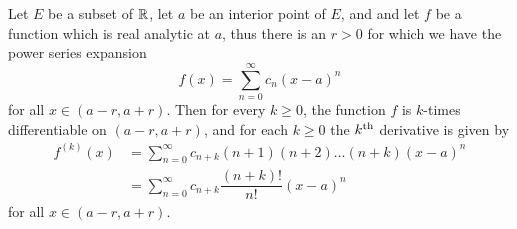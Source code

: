 \setcounter{thm}{5}
\begin{prop}\label{ii:4.2.6}
  Let \(E\) be a subset of \(\mathbb{R}\), let \(a\) be an interior point of \(E\), and and let \(f\) be a function which is real analytic at \(a\), thus there is an \(r > 0\) for which we have the power series expansion
  \[
    f(x) = \sum_{n = 0}^\infty c_n (x - a)^n
  \]
  for all \(x \in (a - r, a + r)\).
  Then for every \(k \geq 0\), the function \(f\) is \(k\)-times differentiable on \((a - r, a + r)\), and for each \(k \geq 0\) the \(k^{\operatorname{th}}\) derivative is given by
  \begin{align*}
    f^{(k)}(x) & = \sum_{n = 0}^\infty c_{n + k} (n + 1) (n + 2) \dots (n + k) (x - a)^n \\
               & = \sum_{n = 0}^\infty c_{n + k} \dfrac{(n + k)!}{n!} (x - a)^n
  \end{align*}
  for all \(x \in (a - r, a + r)\).
\end{prop}

